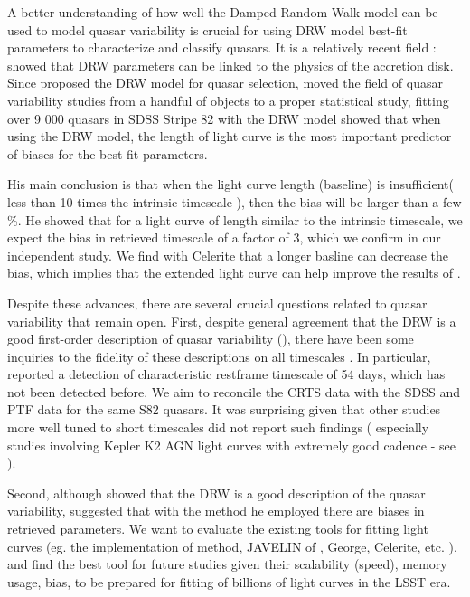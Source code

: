 \documentclass[modern]{aastex62}
\begin{document}
 
A better understanding of how well the Damped Random Walk model can be used to model quasar variability is crucial for using DRW model best-fit parameters to characterize and classify quasars. It is a relatively recent field : \cite{kelly2009} showed that DRW parameters can be linked to the physics of the accretion disk. Since \cite{kozlowski2010} proposed the DRW model for quasar selection, \cite{macleod2010} moved the field of quasar variability studies from a handful of objects to a proper statistical study, fitting over 9 000 quasars in SDSS Stripe 82 with the DRW model \cite{graham2017,kozlowski2017a} showed that when using the  DRW model, the length of light curve is the most important predictor of biases for the best-fit parameters. 

His main conclusion is that when the light curve length (baseline) is insufficient( less than 10 times the intrinsic timescale ), then the bias will be larger than a few \%. He showed that for a light curve of length similar to the intrinsic timescale, we expect the bias in retrieved timescale of a factor of 3, which we confirm in our independent study.  We find with Celerite that a longer basline can decrease the bias, which implies that the extended light curve can help improve the results of \cite{macleod2011}.  

Despite these advances, there are several crucial questions related to quasar variability that remain open. First, despite general agreement that the DRW is a good first-order description of quasar variability (\cite{zu2011,kozlowski2010}), there have been some inquiries to the fidelity of these descriptions on all timescales \cite{zu2013, kasliwal2017, sartori2018}. In particular, \cite{graham2014} reported  a detection of characteristic restframe timescale of 54 days, which has not been detected before.  We  aim to reconcile the CRTS data with the SDSS and PTF data for the same S82 quasars. It was surprising given that other studies more well tuned to short timescales did not report such findings ( especially studies involving Kepler K2  AGN light curves with extremely good cadence - see \cite{kasliwal2015a, aranzana2018, smith2018}).

Second, although \cite{kelly2011} showed that the DRW is a good description of the quasar variability, \cite{kozlowski2017a} suggested that with the method he employed there are biases in retrieved parameters. We want to evaluate the existing tools for fitting light curves (eg. the implementation of \cite{rybicki1995} method, JAVELIN of \cite{zu2011}, George, Celerite, etc. ), and find the best tool for future studies given their scalability (speed), memory usage, bias, to be prepared for fitting of billions of light curves in the LSST era. 
\end{document}
